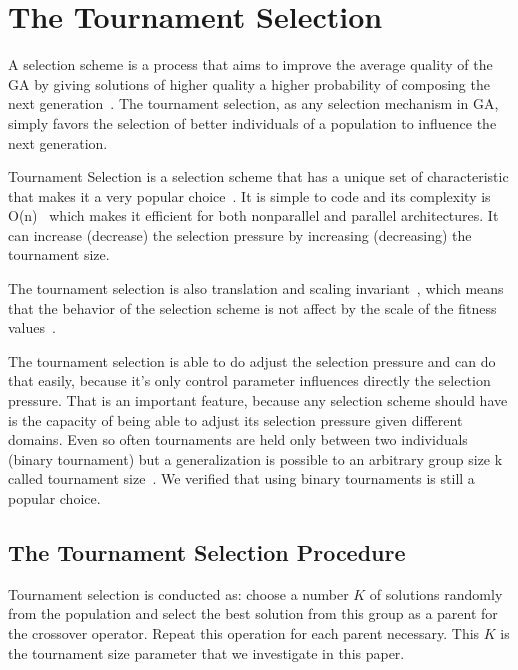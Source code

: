 \section{The Tournament Selection}\label{sec:background:Selection Scheme} 



A selection scheme is a process that aims to improve the average quality of the GA by giving solutions of higher quality a higher probability of composing the next generation~\cite{blickle1995mathematical}.  The tournament selection, as any selection mechanism in GA, simply favors the selection of better individuals of a population to influence the next generation.

Tournament Selection is a selection scheme that has a unique set of characteristic that makes it a very popular choice~\cite{blickle1995mathematical}. It is simple to code and its complexity is O(n)~\cite{goldberg1991comparative} which makes it efficient for both nonparallel and parallel architectures. It can increase (decrease) the selection pressure by increasing (decreasing) the tournament size.

 The tournament selection is also translation and scaling invariant~\cite{maza1993analysis}, which means that the behavior of the selection scheme is not affect by the scale of the fitness values~\cite{back2000evolutionary}.

The tournament selection is able to do adjust the selection pressure and can do that easily, because it's only control parameter influences directly the selection pressure. That is an important feature, because any selection scheme should have is the capacity of being able to adjust its selection pressure given different domains. Even so often tournaments are held only between two individuals (binary tournament) but a generalization is possible to an arbitrary group size k called tournament size~\cite{blickle1995mathematical, goldberg1991comparative}. We verified that using binary tournaments  is still a popular choice. 

\subsection{The Tournament Selection Procedure}\label{sec:background:tournament_selection} 



Tournament selection is conducted as: choose a number $K$ of solutions randomly from the population and select the best solution from this group as a parent for the crossover operator. Repeat this operation for each parent necessary. This $K$ is the tournament size parameter that we investigate in this paper.




